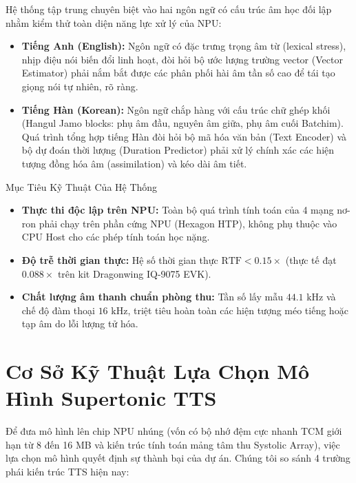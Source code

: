 \documentclass[11pt,a4paper,oneside,table]{report}
\begin{document}
Hệ thống tập trung chuyên biệt vào hai ngôn ngữ có cấu trúc âm học đối lập nhằm kiểm thử toàn diện năng lực xử lý của NPU:
\begin{itemize}
    \item \textbf{Tiếng Anh (English):} Ngôn ngữ có đặc trưng trọng âm từ (lexical stress), nhịp điệu nói biến đổi linh hoạt, đòi hỏi bộ ước lượng trường vector (Vector Estimator) phải nắm bắt được các phân phối hài âm tần số cao để tái tạo giọng nói tự nhiên, rõ ràng.
    \item \textbf{Tiếng Hàn (Korean):} Ngôn ngữ chắp hàng với cấu trúc chữ ghép khối (Hangul Jamo blocks: phụ âm đầu, nguyên âm giữa, phụ âm cuối Batchim). Quá trình tổng hợp tiếng Hàn đòi hỏi bộ mã hóa văn bản (Text Encoder) và bộ dự đoán thời lượng (Duration Predictor) phải xử lý chính xác các hiện tượng đồng hóa âm (assimilation) và kéo dài âm tiết.
\end{itemize}

\begin{technicalbox}{Mục Tiêu Kỹ Thuật Của Hệ Thống}
\begin{itemize}
    \item \textbf{Thực thi độc lập trên NPU:} Toàn bộ quá trình tính toán của 4 mạng nơ-ron phải chạy trên phần cứng NPU (Hexagon HTP), không phụ thuộc vào CPU Host cho các phép tính toán học nặng.
    \item \textbf{Độ trễ thời gian thực:} Hệ số thời gian thực $\text{RTF} < 0.15\times$ (thực tế đạt $\mathbf{0.088\times}$ trên kit Dragonwing IQ-9075 EVK).
    \item \textbf{Chất lượng âm thanh chuẩn phòng thu:} Tần số lấy mẫu $44.1\text{ kHz}$ và chế độ đàm thoại $16\text{ kHz}$, triệt tiêu hoàn toàn các hiện tượng méo tiếng hoặc tạp âm do lỗi lượng tử hóa.
\end{itemize}
\end{technicalbox}

\section{Cơ Sở Kỹ Thuật Lựa Chọn Mô Hình Supertonic TTS}
\label{sec:model_selection}

Để đưa mô hình lên chip NPU nhúng (vốn có bộ nhớ đệm cực nhanh TCM giới hạn từ 8 đến 16 MB và kiến trúc tính toán mảng tâm thu Systolic Array), việc lựa chọn mô hình quyết định sự thành bại của dự án. Chúng tôi so sánh 4 trường phái kiến trúc TTS hiện nay:
\end{document}
